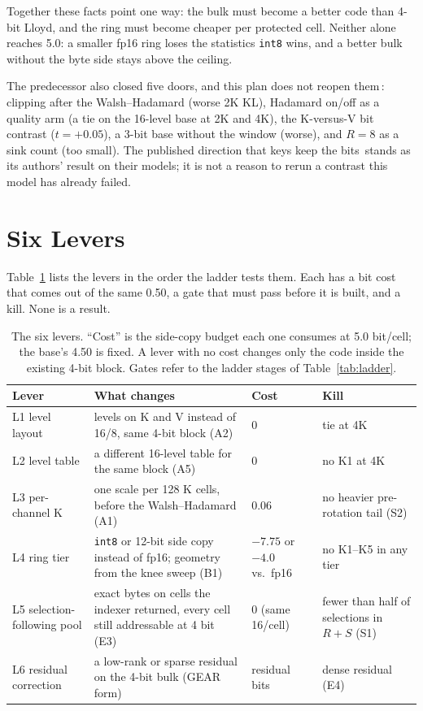 \documentclass[10pt,twocolumn]{article}
\begin{document}
Together these facts point one way: the bulk must become a better code than 4-bit Lloyd, and the ring must become cheaper per protected cell. Neither alone reaches 5.0: a smaller fp16 ring loses the statistics \texttt{int8} wins, and a better bulk without the byte side stays above the ceiling.

The predecessor also closed five doors, and this plan does not reopen them\,\cite{strata-wp}: clipping after the Walsh--Hadamard (worse 2K KL), Hadamard on/off as a quality arm (a tie on the 16-level base at 2K and 4K), the K-versus-V bit contrast ($t{=}+0.05$), a 3-bit base without the window (worse), and $R{=}8$ as a sink count (too small). The published direction that keys keep the bits\,\cite{spectralkv} stands as its authors' result on their models; it is not a reason to rerun a contrast this model has already failed.

\section{Six Levers}\label{sec:levers}

Table~\ref{tab:levers} lists the levers in the order the ladder tests them. Each has a bit cost that comes out of the same 0.50, a gate that must pass before it is built, and a kill. None is a result.

\begin{table}[t]
\centering
\footnotesize
\caption{The six levers. ``Cost'' is the side-copy budget each one consumes at 5.0 bit/cell; the base's 4.50 is fixed. A lever with no cost changes only the code inside the existing 4-bit block. Gates refer to the ladder stages of Table~\ref{tab:ladder}.}
\label{tab:levers}
\begin{tabularx}{\textwidth}{@{}l>{\raggedright\arraybackslash}Xll@{}}
\toprule
Lever & What changes & Cost & Kill \\
\midrule
L1 level layout & 16 levels on K and V instead of 16/8, same 4-bit block (A2) & 0 & tie at 4K \\
L2 level table & a different 16-level table for the same block (A5) & 0 & no K1 at 4K \\
L3 per-channel K & one scale per 128 K cells, before the Walsh--Hadamard (A1) & 0.06 & no heavier pre-rotation tail (S2) \\
L4 ring tier & \texttt{int8} or 12-bit side copy instead of fp16; geometry from the knee sweep (B1) & $-7.75$ or $-4.0$ vs.\ fp16 & no K1--K5 in any tier \\
L5 selection-following pool & exact bytes on cells the indexer returned, every cell still addressable at 4 bit (E3) & 0 (same 16/cell) & fewer than half of selections in $R{+}S$ (S1) \\
L6 residual correction & a low-rank or sparse residual on the 4-bit bulk (GEAR form) & residual bits & dense residual (E4) \\
\bottomrule
\end{tabularx}
\end{table}
\end{document}
